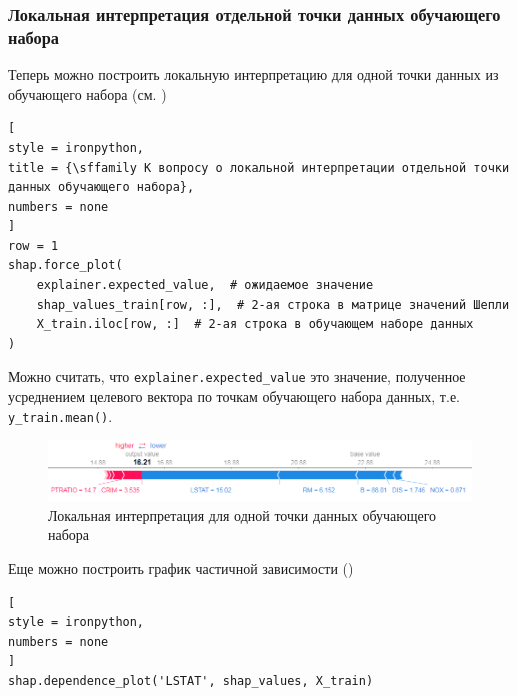 \documentclass[%
	11pt,
	a4paper,
	utf8,
		]{article}
\begin{document}
\subsubsection{Локальная интерпретация отдельной точки данных обучающего набора}

Теперь можно построить локальную интерпретацию для одной точки данных из обучающего набора (см. )

\begin{lstlisting}[
style = ironpython,
title = {\sffamily К вопросу о локальной интерпретации отдельной точки данных обучающего набора},
numbers = none
]
row = 1
shap.force_plot(
    explainer.expected_value,  # ожидаемое значение
    shap_values_train[row, :],  # 2-ая строка в матрице значений Шепли
    X_train.iloc[row, :]  # 2-ая строка в обучающем наборе данных
)
\end{lstlisting}

Можно считать, что \texttt{explainer.expected\_value} это значение, полученное усреднением целевого вектора по точкам обучающего набора данных, т.е. \texttt{y\_train.mean()}.

\begin{figure}[h]
	\centering
	\includegraphics[scale=0.80]{figures/shap_force_plt_train.png}
	\caption{ Локальная интерпретация для одной точки данных обучающего набора }\label{fig:shap_force_plt_train}
\end{figure}

Еще можно построить график частичной зависимости ()

\begin{lstlisting}[
style = ironpython,
numbers = none
]
shap.dependence_plot('LSTAT', shap_values, X_train)
\end{lstlisting}
\end{document}
